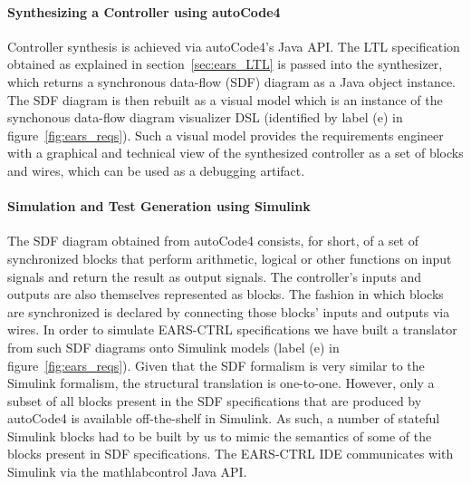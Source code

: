 \paragraph{\textbf{Synthesizing a Controller using \textsf{autoCode4}}\\}
\hspace{-.2cm}Controller synthesis is achieved via \textsf{autoCode4}'s Java
API. The LTL specification obtained as explained in section~\ref{sec:ears_LTL}
is passed into the synthesizer, which returns a synchronous data-flow (SDF)
diagram as a Java object instance. The SDF diagram is then rebuilt as a visual model
which is an instance of the synchonous data-flow diagram visualizer DSL
(identified by label (\textsf{e}) in figure~\ref{fig:ears_reqs}). Such a visual
model provides the requirements engineer with a graphical and technical view of
the synthesized controller as a set of blocks and wires, which can be used as a
debugging artifact.\vspace{-.2cm}
\paragraph{\textbf{Simulation and Test Generation using Simulink}\\}
\hspace{-.2cm}The SDF diagram obtained from \textsf{autoCode4} consists, for
short, of a set of synchronized blocks that perform arithmetic, logical or other functions
on input signals and return the result as output signals. The
controller's inputs and outputs are also themselves represented as blocks. The
fashion in which blocks are synchronized is declared by connecting those blocks'
inputs and outputs via wires. In order to simulate \textsf{EARS-CTRL}
specifications we have built a translator from such SDF diagrams onto Simulink
models (label (\textsf{e}) in figure~\ref{fig:ears_reqs}). Given that the SDF
formalism is very similar to the Simulink formalism, the structural translation is  one-to-one. However, only a subset of all blocks
present in the SDF specifications that are produced by \textsf{autoCode4} is
available off-the-shelf in Simulink. As such, a number of stateful Simulink
blocks had to be built by us to mimic the semantics of some of the blocks
present in SDF specifications. The \textsf{EARS-CTRL} IDE
communicates with Simulink via the \textsf{mathlabcontrol}\cite{mathlabcontrol}
Java API.\vspace{-.6cm}
